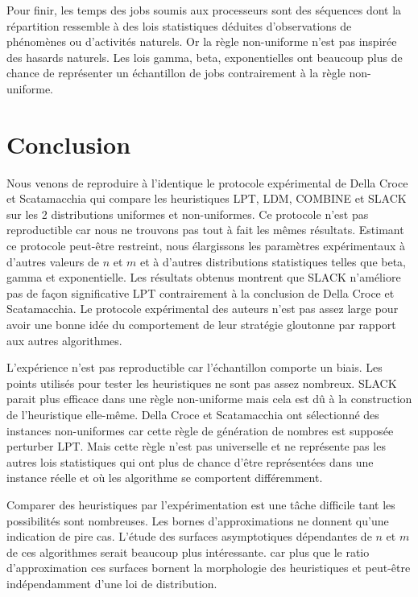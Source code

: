 \documentclass[a4paper,12pt]{report}
\theoremstyle{plain}				%
\theoremstyle{definition}				%
\newcommand\dcs{Della Croce et Scatamacchia\xspace}
\begin{document}
Pour finir, les temps des jobs soumis aux processeurs sont des séquences dont la répartition ressemble à des 
  lois statistiques déduites d'observations de phénomènes ou d'activités naturels. 
Or la règle non-uniforme n'est pas inspirée des hasards naturels. 
Les lois gamma, beta, exponentielles ont beaucoup plus de chance de représenter un échantillon de jobs
  contrairement à la règle non-uniforme. 

\section{Conclusion} \label{sec:conclusion}

Nous venons de reproduire à l'identique le protocole expérimental de \dcs qui compare les heuristiques LPT, LDM, COMBINE et SLACK sur les 2 distributions uniformes et non-uniformes. 
Ce protocole n'est pas reproductible car nous ne trouvons pas tout à fait les mêmes résultats. 
Estimant ce protocole peut-être restreint, nous élargissons les paramètres expérimentaux 
  à d'autres valeurs de $n$ et $m$ et 
  à d'autres distributions statistiques telles que beta, gamma et exponentielle.
Les résultats obtenus montrent que SLACK n'améliore pas de façon significative LPT 
  contrairement à la conclusion de \dcs. 
Le protocole expérimental des auteurs n'est pas assez large pour avoir une bonne idée 
  du comportement de leur stratégie gloutonne par rapport aux autres algorithmes.  
    
L'expérience n'est pas reproductible car l'échantillon comporte un biais. Les points utilisés pour tester les
  heuristiques ne sont pas assez nombreux.
SLACK parait plus efficace dans une règle non-uniforme mais cela est dû à la construction de 
  l'heuristique elle-même. 
\dcs ont sélectionné des instances non-uniformes car cette règle de génération de nombres est supposée 
  perturber LPT. Mais cette règle n'est pas universelle et ne représente pas les autres lois statistiques 
  qui ont plus de chance d'être représentées dans une instance réelle et où les algorithme se 
  comportent différemment.

Comparer des heuristiques par l'expérimentation est une tâche difficile tant les possibilités sont nombreuses. 
Les bornes d'approximations ne donnent qu'une indication de pire cas. 
L'étude des surfaces asymptotiques dépendantes de $n$ et $m$ de ces algorithmes serait beaucoup plus intéressante.
car plus que le ratio d'approximation ces surfaces bornent la morphologie des heuristiques et peut-être
  indépendamment d'une loi de distribution.   
\end{document}
